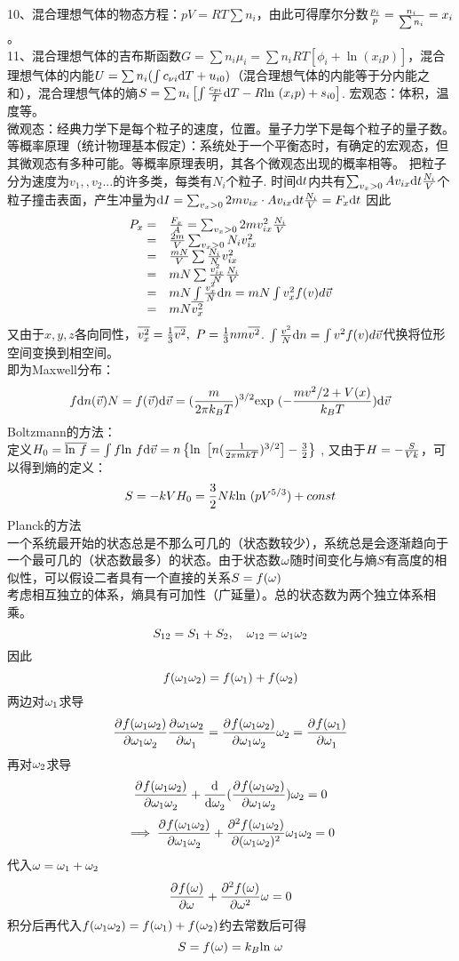 \documentclass[UTF8,9pt]{ctexart}
\begin{document}
10、混合理想气体的物态方程：$pV= RT\sum n_i$，由此可得摩尔分数$\f{p_i}{p}=\f{n_i}{\sum n_i}=x_i$。\\
11、混合理想气体的吉布斯函数$G=\sum n_i\mu_i=\sum n_iRT\left[\phi_i+\ln(x_ip)\right]$，混合理想气体的内能$U=\sum n_i(\int c_{\nu i}\d T+u_{i0})$（混合理想气体的内能等于分内能之和），混合理想气体的熵$S=\sum n_i\left[\int\f{c_{pi}}{T}\d T-R\ln(x_ip)+s_{i0}\right]$. 
    宏观态：体积，温度等。\\
    微观态：经典力学下是每个粒子的速度，位置。量子力学下是每个粒子的量子数。\\
    等概率原理（统计物理基本假定）：系统处于一个平衡态时，有确定的宏观态，但其微观态有多种可能。等概率原理表明，其各个微观态出现的概率相等。
    把粒子分为速度为$v_1,,v_2...$的许多类，每类有$N_i$个粒子. 时间$\d t$内共有$\sum_{v_x>0} Av_{ix}\d t\f{N_i}{V}$个粒子撞击表面，产生冲量为$\d I=\sum_{v_x>0} 2mv_{ix} \cdot Av_{ix}\d t\f{N_i}{V}=F_x\d t$
    因此
    $$\ar{
        P_x=&\f{F_x}{A}=\sum_{v_x>0} 2mv_{ix}^2\f{N_i}{V}\\
        =&\f{2m}{V}\sum_{v_x>0} N_iv_{ix}^2\\
        =&\f{mN}{V}\sum \f{N_i}{N}v_{ix}^2\\
        =& mN\sum \f{v_{ix}^2}{N}\f{N_i}{V}\\
        =&mN\int \f{v_x^2}{N}\d n=mN\int v_x^2f(v)d\vec{v}\\
        =&mN\bar{v_x^2}
    }$$
    又由于$x,y,z$各向同性，$\bar{v_x^2}=\ff{3}\bar{v^2},\ P=\ff{3}nm\bar{v^2}$.
    $\int \f{v^2}{N}\d n=\int v^2f(v)d\vec{v}$代换将位形空间变换到相空间。\\
    即为Maxwell分布：
    $$f{\d n(\vec{v})}{N}=f(\vec{v})\d \vec v =(\f{m}{2\pi k_BT})^{3/2}\exp (-\f{mv^2/2+V(x)}{k_BT})\d \vec v$$
    Boltzmann的方法：\\
    定义$H_0=\bar{\ln f}=\int f\ln f\d\vec v= n\left\{\ln\left[n(\ff{2\pi mkT})^{3/2}\right]-\f{3}{2}\right\}$ , 又由于$H=-\f{S}{Vk}$，可以得到熵的定义：
    $$S=-kVH_0=\f{3}{2}Nk\ln (pV^{5/3})+const$$
    Planck的方法\\
    一个系统最开始的状态总是不那么可几的（状态数较少），系统总是会逐渐趋向于一个最可几的（状态数最多）的状态。由于状态数$\o$随时间变化与熵$S$有高度的相似性，可以假设二者具有一个直接的关系$S=f(\o)$\\
    考虑相互独立的体系，熵具有可加性（广延量）。总的状态数为两个独立体系相乘。
    $$S_{12}=S_1+S_2,\quad \o_{12}=\o_1\o_2$$
    因此
    $$f(\o_1\o_2)=f(\o_1)+f(\o_2)$$
    两边对$\o_1$求导
    $$\pp{f(\o_1\o_2)}{\o_1\o_2}\pp{\o_1\o_2}{\o_1}=\pp{f(\o_1\o_2)}{\o_1\o_2}\o_2=\pp{f(\o_1)}{\o_1}$$
    再对$\o_2$求导
    $$\pp{f(\o_1\o_2)}{\o_1\o_2}+\dd{}{\o_2}(\pp{f(\o_1\o_2)}{\o_1\o_2})\o_2=0$$
    $$\ip \pp{f(\o_1\o_2)}{\o_1\o_2}+\pp[2]{f(\o_1\o_2)}{(\o_1\o_2)}\o_1\o_2=0$$
    代入$\o=\o_1+\o_2$
    $$\pp{f(\o)}{\o}+\pp[2]{f(\o)}{\o}\o=0$$
    积分后再代入$f(\o_1\o_2)=f(\o_1)+f(\o_2)$约去常数后可得
    $$S=f(\o)=k_B\ln \o$$
\end{document}
